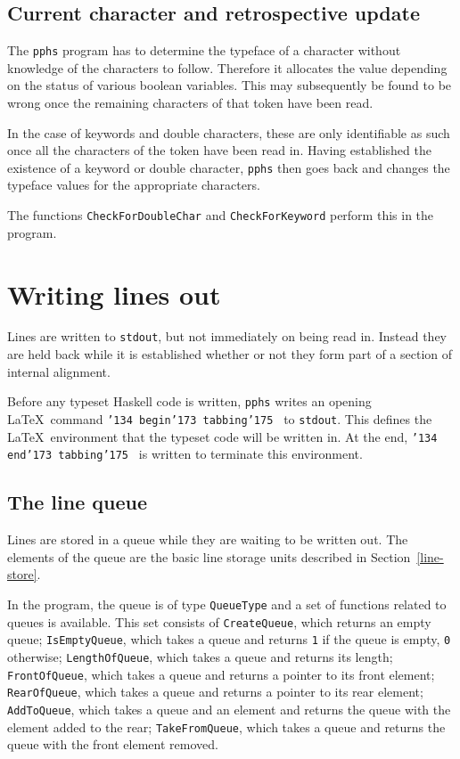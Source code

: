 \subsection{Current character and retrospective update}

The {\tt pphs} program has to determine the typeface of a character without knowledge of the
characters to follow.  Therefore it allocates the value depending on the status
of various boolean variables.  This may subsequently be found to be wrong once the remaining
characters of that token have been read.

In the case of keywords and double characters, these are only identifiable
as such once all the characters of the token have been read in.  Having established
the existence of a keyword or double character, {\tt pphs} then goes back and changes
the typeface values for the appropriate characters.

The functions {\tt CheckForDoubleChar} and {\tt CheckForKeyword} perform this in the
program.

\section{Writing lines out}

Lines are written to {\tt stdout}, but not immediately on being read in.  Instead they
are held back while it is established whether or not they form part of a section of
internal alignment.

Before any typeset Haskell code is written, {\tt pphs} writes an opening \LaTeX\ command
{\tt \char'134 begin\char'173 tabbing\char'175 } to {\tt stdout}.  This defines the
\LaTeX\ environment that the typeset code will be written in.  At the end,
{\tt \char'134 end\char'173 tabbing\char'175 } is written to terminate this
environment.

\subsection{The line queue}

Lines are stored in a queue while they are waiting to be written out.  
The elements of the queue are the basic line storage units described in
Section~\ref{line-store}.

In the program, the queue is of type {\tt QueueType}
and a set of functions related to queues is available.  This set consists of
{\tt CreateQueue}, which returns an empty queue; {\tt IsEmptyQueue}, which takes
a queue and returns {\tt 1} if the queue is empty, {\tt 0} otherwise; {\tt LengthOfQueue},
which takes a queue and returns its length; {\tt FrontOfQueue}, which takes a queue and
returns a pointer to its front element; {\tt RearOfQueue}, which takes a queue and returns
a pointer to its rear element; {\tt AddToQueue}, which takes a queue and an element and
returns the queue with the element added to the rear; {\tt TakeFromQueue}, which takes
a queue and returns the queue with the front element removed.

